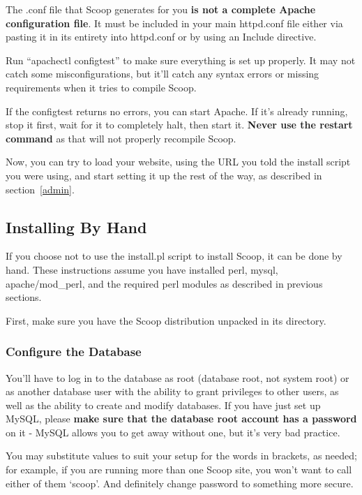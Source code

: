 The .conf file that Scoop generates for you {\bf is not a complete Apache configuration file}.  It must be included in your main httpd.conf file either via pasting it in its entirety into httpd.conf or by using an Include directive.

Run ``apachectl configtest'' to make sure everything is set up properly.  It may not catch some misconfigurations, but it'll catch any syntax errors or missing requirements when it tries to compile Scoop.

If the configtest returns no errors, you can start Apache.  If it's already running, stop it first, wait for it to completely halt, then start it.  {\bf Never use the restart command} as that will not properly recompile Scoop.

Now, you can try to load your website, using the URL you told the install script you were using, and start setting it up the rest of the way, as described in section~\ref{admin}.

\subsection{Installing By Hand}
\label{by-hand}

If you choose not to use the install.pl script to install Scoop, it can be done by hand.  These instructions assume you have installed perl, mysql, apache/mod\_perl, and the required perl modules as described in previous sections.

First, make sure you have the Scoop distribution unpacked in its directory.

\subsubsection{Configure the Database}
\label{manual-db}

You'll have to log in to the database as root (database root, not system root) or as another database user with the ability to grant privileges to other users, as well as the ability to create and modify databases.  If you have just set up MySQL, please {\bf make sure that the database root account has a password} on it - MySQL allows you to get away without one, but it's very bad practice.

You may substitute values to suit your setup for the words in \latexhtml{$<$}{<}brackets\latexhtml{$>$}{>}, as needed; for example, if you are running more than one Scoop site, you won't want to call either of them `scoop'.  And definitely change \latexhtml{$<$}{<}password\latexhtml{$>$}{>} to something more secure.

